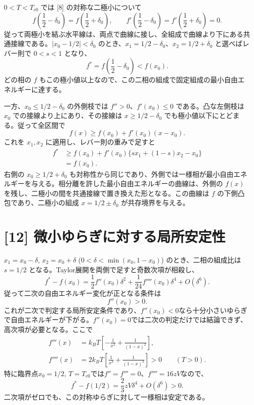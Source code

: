 \documentclass[11pt,a4paper]{article}
\begin{document}
$0<T<T_{c0}$ では [8] の対称な二極小について
\[
 f\!\left(\frac12-\delta_0\right)
 =f\!\left(\frac12+\delta_0\right),\qquad
 f'\!\left(\frac12-\delta_0\right)
 =f'\!\left(\frac12+\delta_0\right)=0.
\]
従って両極小を結ぶ水平線は、両点で曲線に接し、全組成で曲線より下にある共通接線である。$|x_0-1/2|<\delta_0$ のとき、$x_1=1/2-\delta_0$、$x_2=1/2+\delta_0$ と選べばレバー則で $0<s<1$ となり、
\[
 f^*=f\!\left(\frac12-\delta_0\right)<f(x_0).
\]
どの相の $f$ もこの極小値以上なので、この二相の組成で固定組成の最小自由エネルギーに達する。

一方、$x_0\le1/2-\delta_0$ の外側枝では $f''>0$、$f'(x_0)\le0$ である。凸な左側枝は $x_0$ での接線より上にあり、その接線は $x\ge1/2-\delta_0$ でも極小値以下にとどまる。従って全区間で
\[
 f(x)\ge f(x_0)+f'(x_0)(x-x_0).
\]
これを $x_1,x_2$ に適用し、レバー則の重みで足すと
\begin{align*}
 f^*&\ge f(x_0)+f'(x_0)\{sx_1+(1-s)x_2-x_0\}\\
 &=f(x_0).
\end{align*}
右側の $x_0\ge1/2+\delta_0$ も対称性から同じであり、外側では一様相が最小自由エネルギーを与える。相分離を許した最小自由エネルギーの曲線は、外側の $f(x)$ を残し、二極小の間を共通接線で置き換えた形となる。この曲線は $f$ の下側凸包であり、二極小の組成 $x=1/2\pm\delta_0$ が共存境界を与える。

\section*{[12] 微小ゆらぎに対する局所安定性}
$x_1=x_0-\delta$, $x_2=x_0+\delta$ ($0<\delta<\min(x_0,1-x_0)$) のとき、二相の組成比は $s=1/2$ となる。Taylor展開を両側で足すと奇数次項が相殺し、
\begin{equation}
 f^*-f(x_0)=\frac12f''(x_0)\delta^2
 +\frac1{24}f''''(x_0)\delta^4+O(\delta^6).
\end{equation}
従って二次の自由エネルギー変化が正となる条件は
\[
 \boxed{f''(x_0)>0}.
\]
これが二次で判定する局所安定条件であり、$f''(x_0)<0$なら十分小さいゆらぎで自由エネルギーが下がる。$f''(x_0)=0$では二次の判定だけでは結論できず、高次項が必要となる。ここで
\begin{align}
 f'''(x)&=k_BT\left[-\frac1{x^2}+\frac1{(1-x)^2}\right],\\
 f''''(x)&=2k_BT\left[\frac1{x^3}+\frac1{(1-x)^3}\right]>0\qquad(T>0).
\end{align}
特に臨界点$x_0=1/2$, $T=T_{c0}$では$f''=f'''=0$、$f''''=16zV$なので、
\begin{equation}
 f^*-f(1/2)=\frac23zV\delta^4+O(\delta^6)>0.
\end{equation}
二次項がゼロでも、この対称ゆらぎに対して一様相は安定である。
\end{document}
